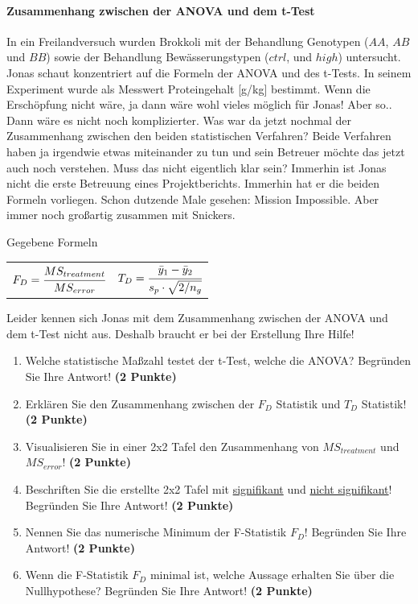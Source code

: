 \documentclass[a4paper, 9pt]{scrartcl}\usepackage[]{graphicx}\usepackage[]{xcolor}
\begin{document}
\ifcollection
\paragraph{Zusammenhang zwischen der ANOVA und dem t-Test}
\fi

In ein Freilandversuch wurden Brokkoli mit der Behandlung Genotypen ($AA$, $AB$ und $BB$) sowie der Behandlung Bewässerungstypen ($ctrl$, und $high$) untersucht. Jonas schaut konzentriert auf die Formeln der ANOVA und des t-Tests. In seinem Experiment wurde als Messwert Proteingehalt [g/kg] bestimmt. Wenn die Erschöpfung nicht wäre, ja dann wäre wohl vieles möglich für Jonas! Aber so.. Dann wäre es nicht noch komplizierter. Was war da jetzt nochmal der Zusammenhang zwischen den beiden statistischen Verfahren? Beide Verfahren haben ja irgendwie etwas miteinander zu tun und sein Betreuer möchte das jetzt auch noch verstehen. Muss das nicht eigentlich klar sein? Immerhin ist Jonas nicht die erste Betreuung eines Projektberichts. Immerhin hat er die beiden Formeln vorliegen. Schon dutzende Male gesehen: Mission Impossible. Aber immer noch großartig zusammen mit Snickers.

\begin{graybox}{Gegebene Formeln}
\begin{center}
  \begin{tabular}{cc}
    $F_{D} = \cfrac{MS_{treatment}}{MS_{error}}$ & $T_{D} = \cfrac{\bar{y}_1 - \bar{y}_2}{s_p \cdot \sqrt{2/n_g}}$\\
  \end{tabular}
\end{center}
\end{graybox}

Leider kennen sich Jonas mit dem Zusammenhang zwischen der ANOVA und dem t-Test nicht aus. Deshalb braucht er bei der Erstellung Ihre Hilfe! 

\begin{enumerate}
\item Welche statistische Maßzahl testet der t-Test, welche die ANOVA? Begründen Sie Ihre Antwort! \textbf{(2 Punkte)}
\item Erklären Sie den Zusammenhang zwischen der $F_{D}$ Statistik und $T_{D}$ Statistik! \textbf{(2 Punkte)}
\item Visualisieren Sie in einer 2x2 Tafel den Zusammenhang von $MS_{treatment}$ und $MS_{error}$! \textbf{(2 Punkte)}
\item Beschriften Sie die erstellte 2x2 Tafel mit \underline{signifikant} und \underline{nicht signifikant}! Begründen Sie Ihre Antwort! \textbf{(2 Punkte)}
\item Nennen Sie das numerische Minimum der F-Statistik $F_D$! Begründen Sie Ihre Antwort! \textbf{(2 Punkte)}
\item Wenn die F-Statistik $F_D$ minimal ist, welche Aussage erhalten Sie über die Nullhypothese? Begründen Sie Ihre Antwort! \textbf{(2 Punkte)}
\end{enumerate}
\end{document}
